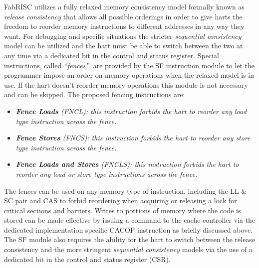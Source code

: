         \vspace{10pt}

        FabRISC utilizes a fully relaxed memory consistency model formally known as \textit{release consistency} that allows all possible orderings in order to give harts the freedom to reorder memory instructions to different addresses in any way they want. For debugging and specific situations the stricter \textit{sequential consistency} model can be utilized and the hart must be able to switch between the two at any time via a dedicated bit in the control and status register. Special instructions, called \textit{``fences''}, are provided by the SF instruction module to let the programmer impose an order on memory operations when the relaxed model is in use. If the hart doesn't reorder memory operations this module is not necessary and can be skipped. The proposed fencing instructions are:

        \begin{itemize}

            \item \textit{\textbf{Fence Loads} (FNCL): this instruction forbids the hart to reorder any load type instruction across the fence.}

            \item \textit{\textbf{Fence Stores} (FNCS): this instruction forbids the hart to reorder any store type instruction across the fence.}

            \item \textit{\textbf{Fence Loads and Stores} (FNCLS): this instruction forbids the hart to reorder any load or store type instructions across the fence.}

        \end{itemize}

        The fences can be used on any memory type of instruction, including the LL \& SC pair and CAS to forbid reordering when acquiring or releasing a lock for critical sections and barriers. Writes to portions of memory where the code is stored can be made effective by issuing a command to the cache controller via the dedicated implementation specific CACOP instruction as briefly discussed above. The SF module also requires the ability for the hart to switch between the release consistency and the more stringent \textit{sequential consistency} models via the use of a dedicated bit in the control and status register (CSR).

